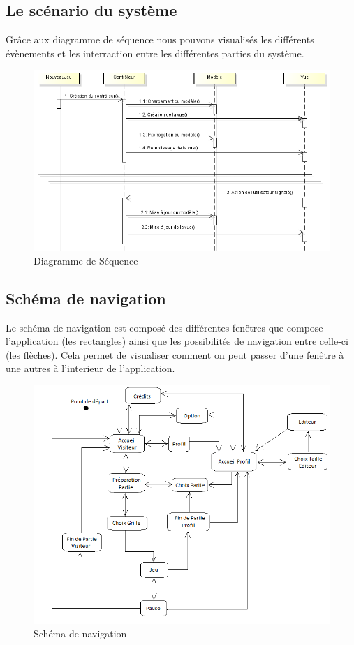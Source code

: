 \documentclass[11pt]{article}
\begin{document}
\subsection{Le scénario du système}

Grâce aux diagramme de séquence nous pouvons visualisés les différents évènements et les interraction entre les différentes parties du système. 

	\begin{figure}[!ht]
		\centering
		\includegraphics{./Diagrammes/DiagrammeDeSequence.png}
		\caption{Diagramme de Séquence}
	\end{figure}

\subsection{Schéma de navigation}

Le schéma de navigation est composé des différentes fenêtres que compose l'application (les rectangles) ainsi que les possibilités de navigation entre celle-ci (les flèches). Cela permet de visualiser comment on peut passer d'une fenêtre à
une autres à l'interieur de l'application.

	\begin{figure}[!ht]
		\centering
		\includegraphics[width=14cm]{./Diagrammes/Schema_navigation.png}
		\caption{Schéma de navigation}
	\end{figure}
\end{document}
